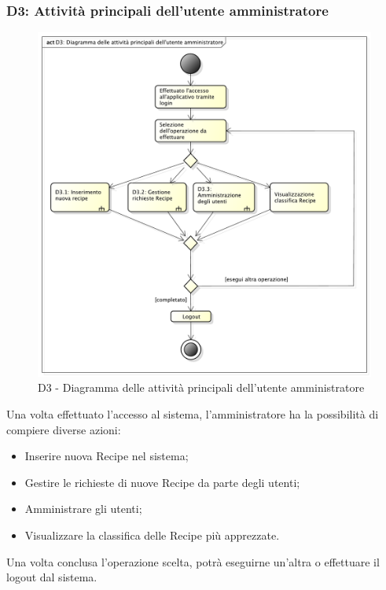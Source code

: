 		\subsubsection{D3: Attività principali dell'utente amministratore} %
		\label{ssub:attivita_principali_dell_utente_amministratore}
		\begin{figure}[!htbp]
			\centering
			\centerline{\includegraphics[scale=0.45]{./images/D3.pdf}}
			\caption{D3 - Diagramma delle attività principali dell'utente amministratore}
		\end{figure}
		\noindent
		Una volta effettuato l'accesso al sistema, l'amministratore ha la possibilità di compiere diverse azioni:
			\begin{itemize}
				\item Inserire nuova Recipe nel sistema;
				\item Gestire le richieste di nuove Recipe da parte degli utenti;
				\item Amministrare gli utenti;
				\item Visualizzare la classifica delle Recipe più apprezzate.
			\end{itemize}
			\noindent
		Una volta conclusa l'operazione scelta, potrà eseguirne un'altra o effettuare il logout dal sistema.



